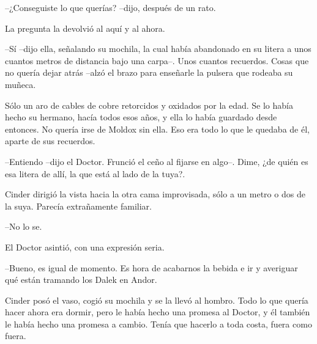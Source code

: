 --¿Conseguiste lo que querías? --dijo, después de un rato. 

La pregunta la devolvió al aquí y al ahora.

--Sí --dijo ella, señalando su mochila, la cual había abandonado en su litera a unos cuantos metros de distancia bajo una carpa--. Unos cuantos recuerdos. Cosas que no quería dejar atrás --alzó el brazo para enseñarle la pulsera que rodeaba su muñeca. 

Sólo un aro de cables de cobre retorcidos y oxidados por la edad. Se lo había hecho su hermano, hacía todos esos años, y ella lo había guardado desde entonces. No quería irse de Moldox sin ella. Eso era todo lo que le quedaba de él, aparte de sus recuerdos.

--Entiendo --dijo el Doctor. Frunció el ceño al fijarse en algo--. Dime, ¿de quién es esa litera de allí, la que está al lado de la tuya?.

Cinder dirigió la vista hacia la otra cama improvisada, sólo a un metro o dos de la suya. Parecía extrañamente familiar.

--No lo se.

El Doctor asintió, con una expresión seria.

--Bueno, es igual de momento. Es hora de acabarnos la bebida e ir y averiguar qué están tramando los Dalek en Andor.

Cinder posó el vaso, cogió su mochila y se la llevó al hombro. Todo lo que quería hacer ahora era dormir, pero le había hecho una promesa al Doctor, y él también le había hecho una promesa a cambio. Tenía que hacerlo a toda costa, fuera como fuera.



